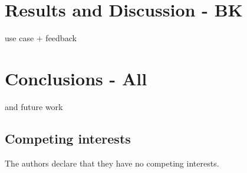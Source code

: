 \documentclass[twocolumn]{bmcart}%
\begin{document}
\section*{Results and Discussion - BK}
use case + feedback

\section*{Conclusions - All}
and future work 


\begin{backmatter}

\section*{Competing interests}
The authors declare that they have no competing interests.







\end{backmatter}
\end{document}
